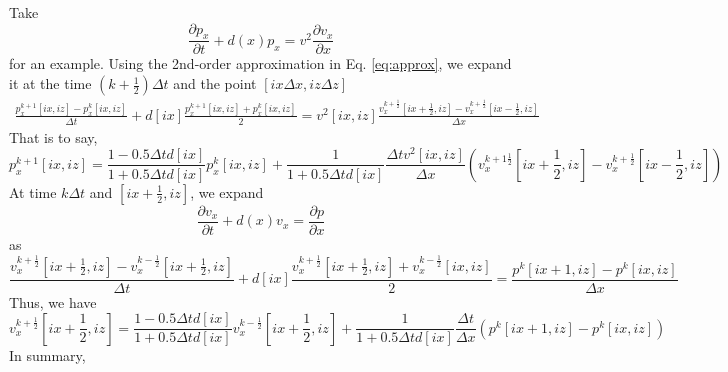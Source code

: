 Take
\begin{displaymath}
\frac{\partial p_x}{\partial t}+d(x)p_x = v^2 \frac{\partial v_x}{\partial x}
\end{displaymath}
for an example. Using the 2nd-order approximation in Eq. \eqref{eq:approx}, we expand it at the time $(k+\frac{1}{2})\Delta t$ and the point $[ix\Delta x, iz\Delta z]$
\begin{equation}
\begin{split} 
\frac{p_x^{k+1}[ix, iz]-p_x^{k}[ix, iz]}{\Delta t}+d[ix]\frac{p_x^{k+1}[ix, iz]+p_x^{k}[ix, iz]}{2}
= v^2[ix,iz]\frac{v_x^{k+\frac{1}{2}}[ix+\frac{1}{2}, iz]-v_x^{k+\frac{1}{2}}[ix-\frac{1}{2}, iz]}{\Delta x}
\end{split}
\end{equation}
That is to say,
\begin{equation}
p_x^{k+1}[ix,iz]=\frac{1-0.5\Delta td[ix]}{1+0.5\Delta t d[ix]}p_x^{k}[ix,iz]+\frac{1}{1+0.5\Delta t d[ix]}\frac{\Delta t v^2[ix,iz]}{\Delta x}(v_x^{k+1\frac{1}{2}}[ix+\frac{1}{2},iz]-v_x^{k+\frac{1}{2}}[ix-\frac{1}{2},iz]) 
\end{equation}
At time $k\Delta t$ and $[ix+\frac{1}{2},iz]$, we expand
\begin{displaymath}
\frac{\partial v_x}{\partial t}+d(x)v_x = \frac{\partial p}{\partial x}
\end{displaymath}
as
\begin{equation}
\frac{v_x^{k+\frac{1}{2}}[ix+\frac{1}{2}, iz]-v_x^{k-\frac{1}{2}}[ix+\frac{1}{2}, iz]}{\Delta t}+d[ix]\frac{v_x^{k+\frac{1}{2}}[ix+\frac{1}{2}, iz]+v_x^{k-\frac{1}{2}}[ix, iz]}{2}=\frac{p^{k}[ix+1, iz]-p^{k}[ix, iz]}{\Delta x}
\end{equation}
Thus, we have
\begin{equation}
v_x^{k+\frac{1}{2}}[ix+\frac{1}{2},iz]=\frac{1-0.5\Delta td[ix]}{1+0.5\Delta t d[ix]}v_x^{k-\frac{1}{2}}[ix+\frac{1}{2},iz]+\frac{1}{1+0.5\Delta t d[ix]}\frac{\Delta t}{\Delta x}(p^k[ix+1,iz]-p^k[ix,iz])
\end{equation}
In summary,

